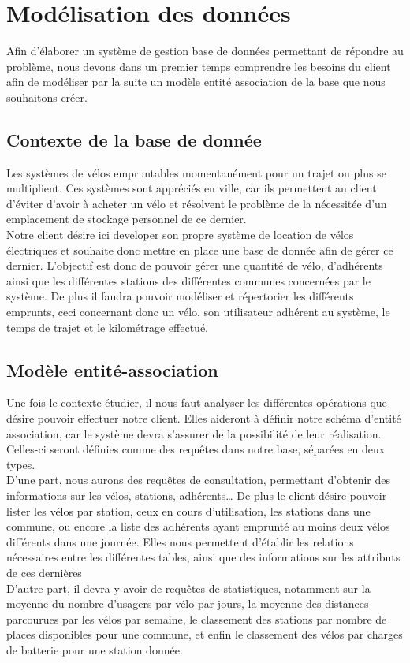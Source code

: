 \documentclass[10pt]{article}
\begin{document}
  \section{Modélisation des données}\label{sec:modelisation}
  Afin d'élaborer un système de gestion base de données permettant de répondre au problème, nous devons dans un premier temps
  comprendre les besoins du client afin de modéliser par la suite un modèle entité association de la base que nous souhaitons créer.\\

  \subsection{Contexte de la base de donnée}\label{subsec:contexte}
  Les systèmes de vélos empruntables momentanément pour un trajet ou plus se multiplient.
  Ces systèmes sont appréciés en ville, car ils permettent au client d'éviter d'avoir à acheter un vélo et résolvent le problème
  de la nécessitée d'un emplacement de stockage personnel de ce dernier. \\
  Notre client désire ici developer son propre système de location de vélos électriques et souhaite donc mettre en place une base de
  donnée afin de gérer ce dernier.
  L'objectif est donc de pouvoir gérer une quantité de vélo, d'adhérents ainsi que les différentes stations des différentes communes
  concernées par le système.
  De plus il faudra pouvoir modéliser et répertorier les différents emprunts, ceci concernant donc un vélo, son utilisateur adhérent au système,
  le temps de trajet et le kilométrage effectué.\\

  \subsection{Modèle entité-association}\label{subsec:modele}
  Une fois le contexte étudier, il nous faut analyser les différentes opérations que désire pouvoir effectuer notre client.
  Elles aideront à définir notre schéma d'entité association, car le système devra s'assurer de la possibilité de leur réalisation.
  Celles-ci seront définies comme des requêtes dans notre base, séparées en deux types.\\
  D'une part, nous aurons des requêtes de consultation, permettant d'obtenir des informations sur les vélos, stations, adhérents\dots
  De plus le client désire pouvoir lister les vélos par station, ceux en cours d'utilisation, les stations dans une commune,
  ou encore la liste des adhérents ayant emprunté au moins deux vélos différents dans une journée.
  Elles nous permettent d'établir les relations nécessaires entre les différentes tables, ainsi que des informations sur les attributs de ces dernières\\
  D'autre part, il devra y avoir de requêtes de statistiques, notamment sur la moyenne du nombre d'usagers par vélo par jours,
  la moyenne des distances parcourues par les vélos par semaine, le classement des stations par nombre de places disponibles pour
  une commune, et enfin le classement des vélos par charges de batterie pour une station donnée.\\
\end{document}
